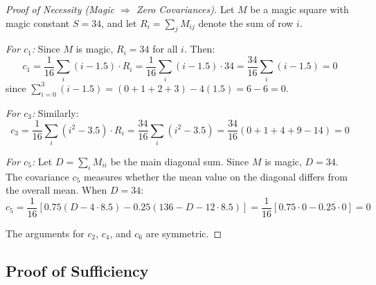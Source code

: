 \begin{proof}[Proof of Necessity (Magic $\Rightarrow$ Zero Covariances)]
Let $M$ be a magic square with magic constant $S = 34$, and let $R_i = \sum_j M_{ij}$ denote the sum of row $i$.

\textit{For $c_1$:} Since $M$ is magic, $R_i = 34$ for all $i$. Then:
\[c_1 = \frac{1}{16}\sum_i (i - 1.5) \cdot R_i = \frac{1}{16}\sum_i (i - 1.5) \cdot 34 = \frac{34}{16}\sum_i (i - 1.5) = 0\]
since $\sum_{i=0}^{3} (i - 1.5) = (0 + 1 + 2 + 3) - 4(1.5) = 6 - 6 = 0$.

\textit{For $c_3$:} Similarly:
\[c_3 = \frac{1}{16}\sum_i (i^2 - 3.5) \cdot R_i = \frac{34}{16}\sum_i (i^2 - 3.5) = \frac{34}{16}(0 + 1 + 4 + 9 - 14) = 0\]

\textit{For $c_5$:} Let $D = \sum_i M_{ii}$ be the main diagonal sum. Since $M$ is magic, $D = 34$. The covariance $c_5$ measures whether the mean value on the diagonal differs from the overall mean. When $D = 34$:
\[c_5 = \frac{1}{16}\left[0.75(D - 4 \cdot 8.5) - 0.25(136 - D - 12 \cdot 8.5)\right] = \frac{1}{16}[0.75 \cdot 0 - 0.25 \cdot 0] = 0\]

The arguments for $c_2$, $c_4$, and $c_6$ are symmetric.
\end{proof}

\subsection{Proof of Sufficiency}

